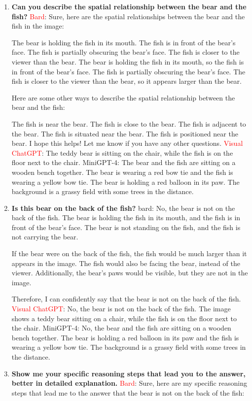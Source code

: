     \begin{enumerate}
        \item \textbf{Can you describe the spatial relationship between the bear and the fish?}
        \subitem \textcolor{Red}{Bard}:
        Sure, here are the spatial relationships between the bear and the fish in the image:

        The bear is holding the fish in its mouth.
        The fish is in front of the bear's face.
        The fish is partially obscuring the bear's face.
        The fish is closer to the viewer than the bear.
        The bear is holding the fish in its mouth, so the fish is in front of the bear's face. The fish is partially obscuring the bear's face. The fish is closer to the viewer than the bear, so it appears larger than the bear.

        Here are some other ways to describe the spatial relationship between the bear and the fish:

        The fish is near the bear.
        The fish is close to the bear.
        The fish is adjacent to the bear.
        The fish is situated near the bear.
        The fish is positioned near the bear.
        I hope this helps! Let me know if you have any other questions.
        \subitem \textcolor{red}{Visual ChatGPT}: The teddy bear is sitting on the chair, while the fish is on the floor next to the chair.
        \subitem MiniGPT-4: The bear and the fish are sitting on a wooden bench together. The bear is wearing a red bow tie and the fish is wearing a yellow bow tie. The bear is holding a red balloon in its paw. The background is a grassy field with some trees in the distance.
        \item \textbf{Is this bear on the back of the fish?}
        \subitem bard:
        No, the bear is not on the back of the fish. The bear is holding the fish in its mouth, and the fish is in front of the bear's face. The bear is not standing on the fish, and the fish is not carrying the bear.
        
        If the bear were on the back of the fish, the fish would be much larger than it appears in the image. The fish would also be facing the bear, instead of the viewer. Additionally, the bear's paws would be visible, but they are not in the image.
        
        Therefore, I can confidently say that the bear is not on the back of the fish.
        \subitem \textcolor{red}{Visual ChatGPT}: No, the bear is not on the back of the fish. The image shows a teddy bear sitting on a chair, while the fish is on the floor next to the chair.
        \subitem MiniGPT-4: No, the bear and the fish are sitting on a wooden bench together. The bear is holding a red balloon in its paw and the fish is wearing a yellow bow tie. The background is a grassy field with some trees in the distance.
        \item \textbf{Show me your specific reasoning steps that lead you to the answer, better in detailed explanation.}
        \subitem \textcolor{Red}{Bard}:
        Sure, here are my specific reasoning steps that lead me to the answer that the bear is not on the back of the fish:
        

\end{enumerate}
